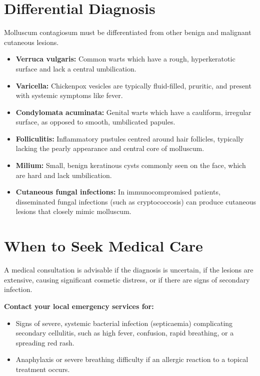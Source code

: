 \section*{Differential Diagnosis}
Molluscum contagiosum must be differentiated from other benign and malignant cutaneous lesions.
\begin{itemize}
    \item \textbf{Verruca vulgaris:} Common warts which have a rough, hyperkeratotic surface and lack a central umbilication.
    \item \textbf{Varicella:} Chickenpox vesicles are typically fluid-filled, pruritic, and present with systemic symptoms like fever.
    \item \textbf{Condylomata acuminata:} Genital warts which have a cauliform, irregular surface, as opposed to smooth, umbilicated papules.
    \item \textbf{Folliculitis:} Inflammatory pustules centred around hair follicles, typically lacking the pearly appearance and central core of molluscum.
    \item \textbf{Milium:} Small, benign keratinous cysts commonly seen on the face, which are hard and lack umbilication.
    \item \textbf{Cutaneous fungal infections:} In immunocompromised patients, disseminated fungal infections (such as cryptococcosis) can produce cutaneous lesions that closely mimic molluscum.
\end{itemize}

\section*{When to Seek Medical Care}
A medical consultation is advisable if the diagnosis is uncertain, if the lesions are extensive, causing significant cosmetic distress, or if there are signs of secondary infection.

\textbf{Contact your local emergency services for:}
\begin{itemize}
    \item Signs of severe, systemic bacterial infection (septicaemia) complicating secondary cellulitis, such as high fever, confusion, rapid breathing, or a spreading red rash.
    \item Anaphylaxis or severe breathing difficulty if an allergic reaction to a topical treatment occurs.
\end{itemize}

